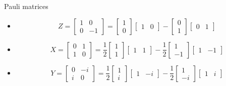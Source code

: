 \documentclass{beamer}
\begin{document}
\begin{frame}{Pauli matrices}
\begin{itemize}
\setlength{\itemsep}{3em}
\item 
\begin{equation*}
Z=\begin{bmatrix}1&0\\0&-1\end{bmatrix}=
\begin{bmatrix}1\\0\end{bmatrix}\begin{bmatrix}1&0\end{bmatrix}
-\begin{bmatrix}0\\1\end{bmatrix}\begin{bmatrix}0&1\end{bmatrix}
\end{equation*}
\item 
\begin{equation*}
X=\begin{bmatrix}0&1\\1&0\end{bmatrix}=
\frac12\begin{bmatrix}1\\1\end{bmatrix}\begin{bmatrix}1&1\end{bmatrix}
-\frac12\begin{bmatrix}1\\-1\end{bmatrix}\begin{bmatrix}1&-1\end{bmatrix}
\end{equation*}
\item 
\begin{equation*}
Y=\begin{bmatrix}0&-i\\i&0\end{bmatrix}=
\frac12\begin{bmatrix}1\\i\end{bmatrix}\begin{bmatrix}1&-i\end{bmatrix}
-\frac12\begin{bmatrix}1\\-i\end{bmatrix}\begin{bmatrix}1&i\end{bmatrix}
\end{equation*}
\end{itemize}
\end{frame}
\end{document}
